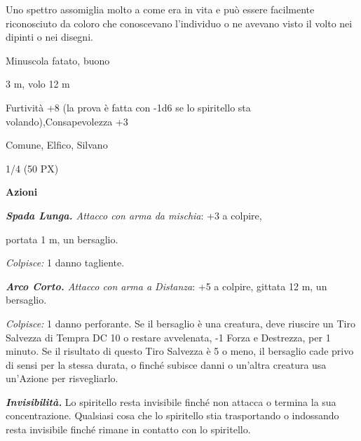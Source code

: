 \begin{multicols}{2}
{Uno spettro assomiglia molto a come era in vita e può essere facilmente riconosciuto da coloro che conoscevano l’individuo o ne avevano visto il volto nei dipinti o nei disegni.

\begin{description}[noitemsep, topsep=0pt, parsep=0pt, partopsep=0pt, itemsep=1pt, leftmargin=2.35cm,  labelwidth=2.2cm, itemindent=0cm, listparindent=0pt] %
\setlength{\baselineskip}{10pt}
\item[\textbf{Taglia/Tipo}] Minuscola fatato, buono
\item[\textbf{Caratt.}] 
\item[\textbf{Punti Ferita}] 
\item[\textbf{Movimento}] 3 m, volo 12 m
\item[\textbf{Tiri Salvez.}] 
\item[\textbf{Comp.}] Furtività +8 (la prova è fatta con -1d6 se lo spiritello sta volando),Consapevolezza +3
\item[\textbf{Linguaggi}] Comune, Elfico, Silvano
\item[\textbf{Sfida}] 1/4 (50 PX)
\end{description}
\smallskip

\textbf{Azioni}

\emph{\textbf{Spada Lunga.} Attacco con arma da mischia}: +3 a colpire,

portata 1 m, un bersaglio.

\emph{Colpisce:} 1 danno tagliente.

\emph{\textbf{Arco Corto.} Attacco con arma a Distanza}: +5 a colpire, gittata 12 m, un bersaglio.

\emph{Colpisce:} 1 danno perforante. Se il bersaglio è una creatura, deve riuscire un Tiro Salvezza di Tempra DC 10 o restare avvelenata, -1 Forza e Destrezza, per 1 minuto. Se il risultato di questo Tiro Salvezza è 5 o meno, il bersaglio cade privo di sensi per la stessa durata, o finché subisce danni o un'altra creatura usa un'Azione per risvegliarlo.

\emph{\textbf{Invisibilità.}} Lo spiritello resta invisibile finché non attacca o termina la sua concentrazione. Qualsiasi cosa che lo spiritello stia trasportando o indossando resta invisibile finché rimane in contatto con lo spiritello.

}
\end{multicols}
